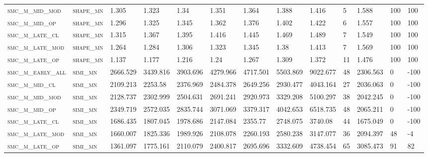 \begin{landscape}
\begin{center}
\begin{footnotesize}
\begin{longtable}{lllllllllllll}
\textsc{smc\_m\_mid\_mod  } & \textsc{shape\_mn }   & 1.305    & 1.323    & 1.34     & 1.351    & 1.364    & 1.388    & 1.416    & 5      & 1.588         & 100           & 100      \\
\textsc{smc\_m\_mid\_op   } & \textsc{shape\_mn }   & 1.296    & 1.325    & 1.345    & 1.362    & 1.376    & 1.402    & 1.422    & 6      & 1.557         & 100           & 100      \\
\textsc{smc\_m\_late\_cl  } & \textsc{shape\_mn }   & 1.315    & 1.367    & 1.395    & 1.416    & 1.445    & 1.469    & 1.489    & 7      & 1.549         & 100           & 100      \\
\textsc{smc\_m\_late\_mod } & \textsc{shape\_mn }   & 1.264    & 1.284    & 1.306    & 1.323    & 1.345    & 1.38     & 1.413    & 7      & 1.569         & 100           & 100      \\
\textsc{smc\_m\_late\_op  } & \textsc{shape\_mn }   & 1.137    & 1.177    & 1.216    & 1.24     & 1.267    & 1.309    & 1.372    & 11     & 1.476         & 100           & 100      \\
\textsc{smc\_m\_early\_all} & \textsc{simi\_mn  }   & 2666.529 & 3439.816 & 3903.696 & 4279.966 & 4717.501 & 5503.869 & 9022.677 & 48     & 2306.563      & 0             & -100     \\
\textsc{smc\_m\_mid\_cl   } & \textsc{simi\_mn  }   & 2109.213 & 2253.58  & 2376.969 & 2484.378 & 2649.256 & 2930.477 & 4043.164 & 27     & 2036.063      & 0             & -100     \\
\textsc{smc\_m\_mid\_mod  } & \textsc{simi\_mn  }   & 2128.737 & 2302.999 & 2504.631 & 2691.241 & 2920.973 & 3329.208 & 5100.297 & 38     & 2042.245      & 0             & -100     \\
\textsc{smc\_m\_mid\_op   } & \textsc{simi\_mn  }   & 2349.719 & 2572.035 & 2835.744 & 3071.069 & 3379.317 & 4042.653 & 6518.735 & 48     & 2065.211      & 0             & -100     \\
\textsc{smc\_m\_late\_cl  } & \textsc{simi\_mn  }   & 1686.435 & 1807.045 & 1978.686 & 2147.084 & 2355.77  & 2748.075 & 3740.08  & 44     & 1675.049      & 0             & -100     \\
\textsc{smc\_m\_late\_mod } & \textsc{simi\_mn  }   & 1660.007 & 1825.336 & 1989.926 & 2108.078 & 2260.193 & 2580.238 & 3147.077 & 36     & 2094.397      & 48            & -4       \\
\textsc{smc\_m\_late\_op  } & \textsc{simi\_mn  }   & 1361.097 & 1775.161 & 2110.079 & 2400.817 & 2695.696 & 3332.609 & 4738.454 & 65     & 3085.473      & 91            & 82       \\%

\end{longtable}
\end{footnotesize}
\end{center}
\end{landscape}

